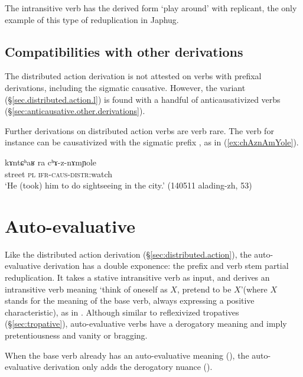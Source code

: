 The intransitive verb  has the derived form  `play around' with  replicant, the only example of this type of reduplication in Japhug.
\subsection{Compatibilities with other derivations} \label{sec:distributed.action.other}
The distributed action derivation is not attested on verbs with prefixal derivations, including the sigmatic causative. However, the  variant (§\ref{sec.distributed.action.l}) is found with a handful of anticausativized verbs (§\ref{sec:anticausative.other.derivations}).

Further derivations on distributed action verbs are verb rare. The verb  for instance can be causativized with the sigmatic prefix , as in (\ref{ex:chAznAmYole}).

\begin{exe}
\ex \label{ex:chAznAmYole}
\gll kɤntɕʰaʁ ra cʰɤ-z-nɤmɲole \\
street \textsc{pl} \textsc{ifr}-\textsc{caus}-\textsc{distr}:watch \\
\glt `He (took) him to do sightseeing in the city.' (140511 alading-zh, 53)
\end{exe}


\section{Auto-evaluative} \label{sec:autoevaluative}
Like the distributed action derivation (§\ref{sec:distributed.action}), the auto-evaluative derivation has a double exponence: the prefix  and verb stem partial reduplication. It takes a stative intransitive verb as input, and derives an intransitive verb meaning `think of oneself as $X$, pretend to be $X$'(where $X$ stands for the meaning of the base verb, always expressing a positive characteristic), as in . Although similar to reflexivized tropatives (§\ref{sec:tropative}), auto-evaluative verbs have a derogatory meaning and imply pretentiousness and vanity or bragging.

When the base verb already has an auto-evaluative meaning (), the auto-evaluative derivation only adds the derogatory nuance ().

